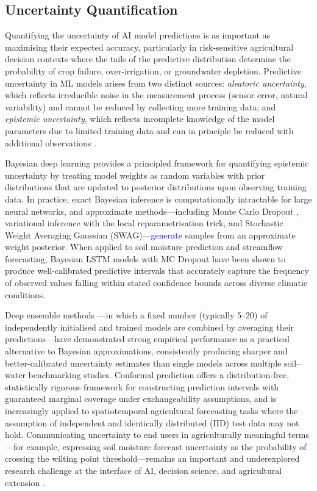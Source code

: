 \documentclass[land,article,submit,pdftex,moreauthors]{Definitions/mdpi}
\numberwithin{equation}{section}
\begin{document}
\subsection{Uncertainty Quantification}

Quantifying the uncertainty of AI model predictions is as important as maximising their expected accuracy, particularly in risk-sensitive agricultural decision contexts where the tails of the predictive distribution determine the probability of crop failure, over-irrigation, or groundwater depletion. Predictive uncertainty in ML models arises from two distinct sources: \emph{aleatoric uncertainty}, which reflects irreducible noise in the measurement process (sensor error, natural variability) and cannot be reduced by collecting more training data; and \emph{epistemic uncertainty}, which reflects incomplete knowledge of the model parameters due to limited training data and can in principle be reduced with additional observations \citep{hullermeier2021aleatoric}.

Bayesian deep learning provides a principled framework for quantifying epistemic uncertainty by treating model weights as random variables with prior distributions that are updated to posterior distributions upon observing training data. In practice, exact Bayesian inference is computationally intractable for large neural networks, and approximate methods---including Monte Carlo Dropout \citep{gal2016dropout}, variational inference with the local reparametrisation trick, and Stochastic Weight Averaging Gaussian (SWAG)---\textcolor{blue}{generate} samples from an approximate weight posterior. When applied to soil moisture prediction and streamflow forecasting, Bayesian LSTM models with MC Dropout have been shown to produce well-calibrated predictive intervals that accurately capture the frequency of observed values falling within stated confidence bounds across diverse climatic conditions.

Deep ensemble methods \citep{lakshminarayanan2017simple}---in which a fixed number (typically 5--20) of independently initialised and trained models are combined by averaging their predictions---have demonstrated strong empirical performance as a practical alternative to Bayesian approximations, consistently producing sharper and better-calibrated uncertainty estimates than single models across multiple soil--water benchmarking studies. Conformal prediction \citep{angelopoulos2023conformal} offers a distribution-free, statistically rigorous framework for constructing prediction intervals with guaranteed marginal coverage under exchangeability assumptions, and is increasingly applied to spatiotemporal agricultural forecasting tasks where the assumption of independent and identically distributed (IID) test data may not hold. Communicating uncertainty to end users in agriculturally meaningful terms---for example, expressing soil moisture forecast uncertainty as the probability of crossing the wilting point threshold---remains an important and underexplored research challenge at the interface of AI, decision science, and agricultural extension \citep{moges2021review}.
\end{document}
